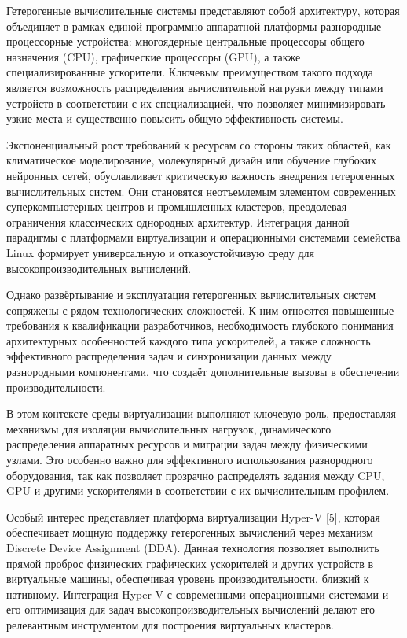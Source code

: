 \documentclass[areaset=advanced]{scrartcl}
\begin{document}
Гетерогенные вычислительные системы представляют собой архитектуру, которая объединяет в рамках единой программно-аппаратной платформы разнородные процессорные устройства: многоядерные центральные процессоры общего назначения (CPU), графические процессоры (GPU), а также специализированные ускорители. Ключевым преимуществом такого подхода является возможность распределения вычислительной нагрузки между типами устройств в соответствии с их специализацией, что позволяет минимизировать узкие места и существенно повысить общую эффективность системы.

Экспоненциальный рост требований к ресурсам со стороны таких областей, как климатическое моделирование, молекулярный дизайн или обучение глубоких нейронных сетей, обуславливает критическую важность внедрения гетерогенных вычислительных систем. Они становятся неотъемлемым элементом современных суперкомпьютерных центров и промышленных кластеров, преодолевая ограничения классических однородных архитектур. Интеграция данной парадигмы с платформами виртуализации и операционными системами семейства Linux формирует универсальную и отказоустойчивую среду для высокопроизводительных вычислений.

Однако развёртывание и эксплуатация гетерогенных вычислительных систем сопряжены с рядом технологических сложностей. К ним относятся повышенные требования к квалификации разработчиков, необходимость глубокого понимания архитектурных особенностей каждого типа ускорителей, а также сложность эффективного распределения задач и синхронизации данных между разнородными компонентами, что создаёт дополнительные вызовы в обеспечении производительности.

В этом контексте среды виртуализации выполняют ключевую роль, предоставляя механизмы для изоляции вычислительных нагрузок, динамического распределения аппаратных ресурсов и миграции задач между физическими узлами. Это особенно важно для эффективного использования разнородного оборудования, так как позволяет прозрачно распределять задания между CPU, GPU и другими ускорителями в соответствии с их вычислительным профилем.

Особый интерес представляет платформа виртуализации Hyper-V [5], которая обеспечивает мощную поддержку гетерогенных вычислений через механизм Discrete Device Assignment (DDA). Данная технология позволяет выполнить прямой проброс физических графических ускорителей и других устройств в виртуальные машины, обеспечивая уровень производительности, близкий к нативному. Интеграция Hyper-V с современными операционными системами и его оптимизация для задач высокопроизводительных вычислений делают его релевантным инструментом для построения виртуальных кластеров.
\end{document}
